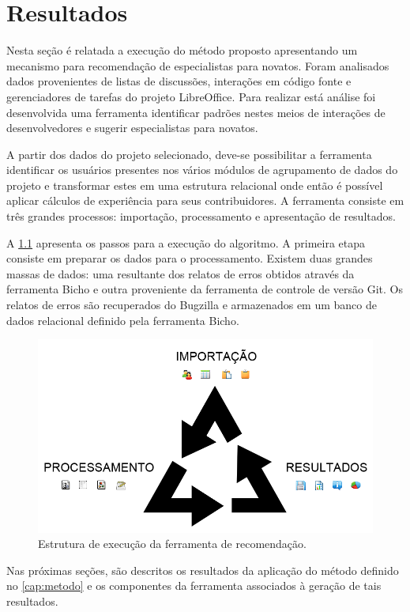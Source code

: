 \documentclass[oneside,brazil,a4paper]{normas-utf-tex}
\begin{document}
\chapter{Resultados}
\label{cap:resultados}


\vspace{-1.5cm}
Nesta seção é relatada a execução do método proposto apresentando um mecanismo para recomendação de especialistas para novatos. Foram analisados dados provenientes de listas de discussões, interações em código fonte e gerenciadores de tarefas do projeto LibreOffice. Para realizar está análise foi desenvolvida uma ferramenta identificar padrões nestes meios de interações de desenvolvedores e sugerir especialistas para novatos.

A partir dos dados do projeto selecionado, deve-se possibilitar a ferramenta identificar os usuários presentes nos vários módulos de agrupamento de dados do projeto e transformar estes em uma estrutura relacional onde então é possível aplicar cálculos de experiência para seus contribuidores. A ferramenta consiste em três grandes processos: importação, processamento e apresentação de resultados.

A \cref{fig:process} apresenta os passos para a execução do algoritmo. A primeira etapa consiste em preparar os dados para o processamento. Existem duas grandes massas de dados: uma resultante dos relatos de erros obtidos através da ferramenta Bicho e outra proveniente da ferramenta de controle de versão Git. Os relatos de erros são recuperados do Bugzilla e armazenados em um banco de dados relacional definido pela ferramenta Bicho.

\begin{figure}[hb]
    \centering
    \includegraphics[width= .7\textwidth]{figuras/import}
    \caption{Estrutura de execução da ferramenta de recomendação.}
    \label{fig:process}
\end{figure}

Nas próximas seções, são descritos os resultados da aplicação do método definido no \cref{cap:metodo} e os componentes da ferramenta associados à geração de tais resultados.
\end{document}
